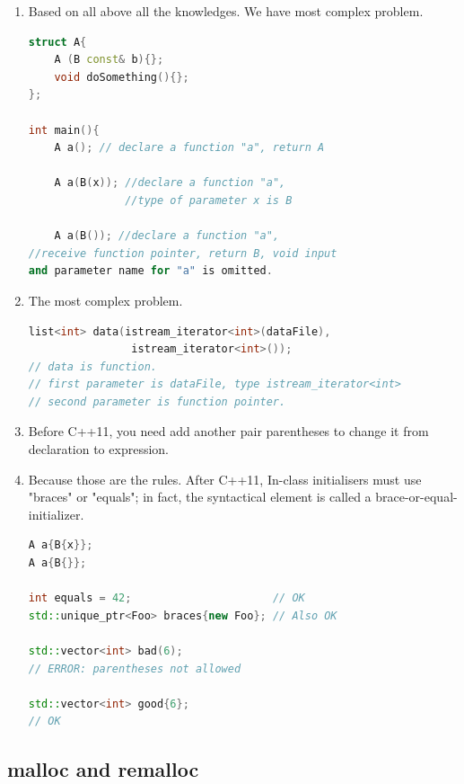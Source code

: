 \documentclass[a4paper,12pt,twoside]{book}
\begin{document}
\begin{enumerate}
\item Based on all above all the knowledges. We have most complex problem.
\begin{lstlisting}[frame=single, language=c++, mathescape=true]
struct A{
    A (B const& b){};
    void doSomething(){};
};
 
int main(){    
    A a(); // declare a function "a", return A
    
    A a(B(x)); //declare a function "a",   
               //type of parameter x is B
               
    A a(B()); //declare a function "a",
//receive function pointer, return B, void input
and parameter name for "a" is omitted.   
\end{lstlisting}

\item The most complex problem.
\begin{lstlisting}[frame=single, language=c++, mathescape=true]
list<int> data(istream_iterator<int>(dataFile), 
                istream_iterator<int>()); 
// data is function.
// first parameter is dataFile, type istream_iterator<int>
// second parameter is function pointer. 
\end{lstlisting}

\item Before C++11, you need add another pair parentheses to change it from declaration to expression. 

\item Because those are the rules. After C++11, In-class initialisers must use "braces" or "equals"; in fact, the syntactical element is called a brace-or-equal-initializer. 
\begin{lstlisting}[frame=single, language=c++, mathescape=true]
A a{B{x}};
A a{B{}};

int equals = 42;                      // OK
std::unique_ptr<Foo> braces{new Foo}; // Also OK

std::vector<int> bad(6); 
// ERROR: parentheses not allowed

std::vector<int> good{6};
// OK    
\end{lstlisting}

\end{enumerate}

\subsection{malloc and remalloc}
\end{document}
